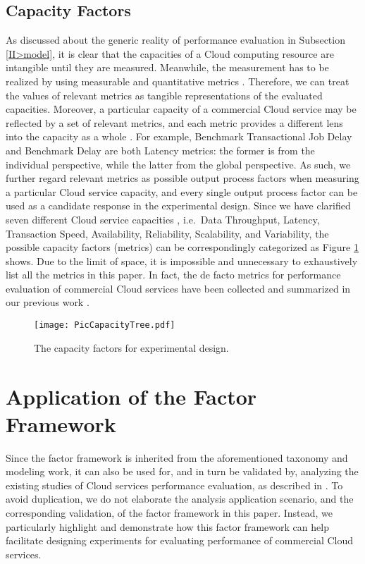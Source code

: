 \documentclass[10pt, conference, compsocconf]{IEEEtran}
\begin{document}
\subsection{Capacity Factors}
As discussed about the generic reality of performance evaluation in Subsection \ref{II>model}, it is clear that the capacities of a Cloud computing resource are intangible until they are measured. Meanwhile, the measurement has to be realized by using measurable and quantitative metrics \cite{Le_Boudec_2011}. Therefore, we can treat the values of relevant metrics as tangible representations of the evaluated capacities. Moreover, a particular capacity of a commercial Cloud service may be reflected by a set of relevant metrics, and each metric provides a different lens into the capacity as a whole \cite{Fortier_Michel_2003}. For example, Benchmark Transactional Job Delay \cite{Luckow_Jha_2010} and Benchmark Delay \cite{Juve_Deelman_2009} are both Latency metrics: the former is from the individual perspective, while the latter from the global perspective.
As such, we further regard relevant metrics as possible output process factors \cite{Antony_2003} when measuring a particular Cloud service capacity, and every single output process factor can be used as a candidate response \cite{Antony_2003} in the experimental design. Since we have clarified seven different Cloud service capacities \cite{Li_OBrien_2012a}, i.e.~Data Throughput, Latency, Transaction Speed, Availability, Reliability, Scalability, and Variability, the possible capacity factors (metrics) can be correspondingly categorized as Figure \ref{fig>PicCapacityTree} shows. Due to the limit of space, it is impossible and unnecessary to exhaustively list all the metrics in this paper. In fact, the de facto metrics for performance evaluation of commercial Cloud services have been collected and summarized in our previous work \cite{Li_OBrien_2012b}.

\begin{figure}[!t]
\centering
\texttt{[image: PicCapacityTree.pdf]}
\caption{The capacity factors for experimental design.}
\label{fig>PicCapacityTree}
\end{figure}
 

\section{Application of the Factor Framework}
\label{IV}
Since the factor framework is inherited from the aforementioned taxonomy and modeling work, it can also be used for, and in turn be validated by, analyzing the existing studies of Cloud services performance evaluation, as described in \cite{Li_OBrien_2012a,Li_OBrien_2012c}. To avoid duplication, we do not elaborate the analysis application scenario, and the corresponding validation, of the factor framework in this paper. Instead, we particularly highlight and demonstrate how this factor framework can help facilitate designing experiments for evaluating performance of commercial Cloud services.
\end{document}
